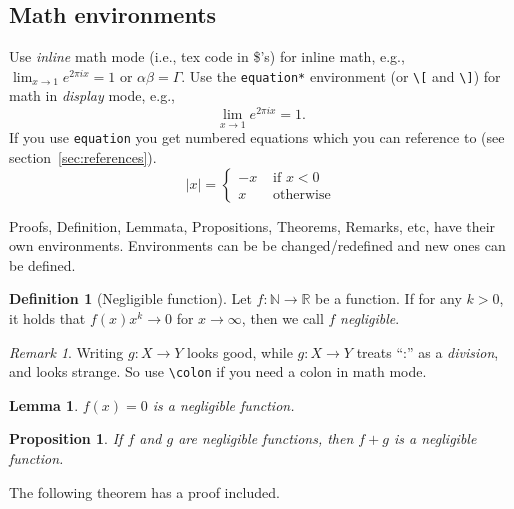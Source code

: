 \documentclass[11pt]{scrartcl}
\theoremstyle{plain} %
\newtheorem{proposition}[theorem]{Proposition}
\newtheorem{lemma}[theorem]{Lemma}
\theoremstyle{definition} %
\newtheorem{definition}[theorem]{Definition}
\theoremstyle{remark} %
\newtheorem{remark}[theorem]{Remark}
\newcommand{\IN}{\mathbb{N}} %
\newcommand{\IR}{\mathbb{R}} %
\begin{document}
\subsection{Math environments}
\label{subsec:math-env}

Use \emph{inline} math mode (i.e., tex code in \$'s) for inline math,
e.g., $\lim_{x \to 1} e^{2 \pi i x} = 1$ or $\alpha \beta = \Gamma$.
Use the \verb|equation*| environment (or \verb|\[| and \verb|\]|)
for math in \emph{display} mode, e.g.,
\begin{equation*}
  \lim_{x \to 1} e^{2 \pi i x} = 1.
\end{equation*}
If you use \verb|equation| you get numbered equations which you can reference to (see section~\ref{sec:references}).
\begin{equation}
  \label{eq:eqn}
  |x| = \left\{
  \begin{array}{rl}
    -x &\mbox{ if $x<0$} \\
    x &\mbox{ otherwise}
  \end{array}
  \right.
\end{equation}

Proofs, Definition, Lemmata, Propositions, Theorems, Remarks, etc, have their own environments.
Environments can be be changed/redefined and new ones can be defined.

\begin{definition}[Negligible function]
  \label{def:negl}
  Let $f \colon \IN \to \IR$ be a function.
  If for any $k > 0$, it holds that $f(x) x^k \rightarrow 0$ for $x \to \infty$,
  then we call $f$ \emph{negligible}.
\end{definition}

\begin{remark}
  Writing $g \colon X \to Y$ looks good, while $g: X \to Y$ treats ``:'' as a \emph{division}, and looks strange.
  So use \verb|\colon| if you need a colon in math mode.
\end{remark}

\begin{lemma}
  $f(x) = 0$ is a negligible function.
\end{lemma}

\begin{proposition}
  If $f$ and $g$ are negligible functions,
  then $f + g$ is a negligible function.
\end{proposition}

The following theorem has a proof included.
\end{document}
